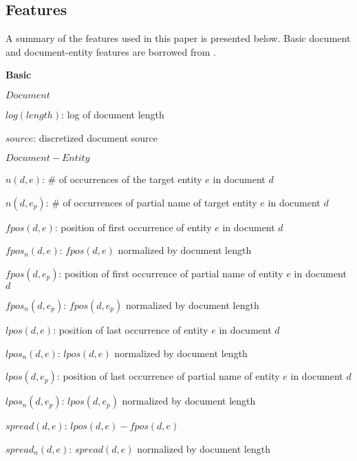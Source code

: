 \documentclass{article}
\begin{document}
\subsection{Features}
\label{feat}

A summary of the features used in this paper is presented below. Basic document and document-entity features are borrowed from \cite{jingang13}.

\begin{itemize*}
  \item \textbf{Basic}
    \begin{itemize*}
      \item $Document$
        \begin{itemize*}
            \item $log(length)$: log of document length
            \item $source$: discretized document source
        \end{itemize*}
      \item $Document-Entity$
        \begin{itemize*}
            \item $n(d,e)$: \# of occurrences of the target entity $e$ in document $d$
            \item $n(d,e_p)$: \# of occurrences of partial name of target entity $e$ in document $d$
            \item $fpos(d,e)$: position of first occurrence of entity $e$ in document $d$
            \item $fpos_n(d,e)$: $fpos(d,e)$ normalized by document length
            \item $fpos(d,e_p)$: position of first occurrence of partial name of entity $e$ in document $d$
            \item $fpos_n(d,e_p)$: $fpos(d,e_p)$ normalized by document length
            \item $lpos(d,e)$: position of last occurrence of entity $e$ in document $d$
            \item $lpos_n(d,e)$: $lpos(d,e)$ normalized by document length
            \item $lpos(d,e_p)$: position of last occurrence of partial name of entity $e$ in document $d$
            \item $lpos_n(d,e_p)$: $lpos(d,e_p)$ normalized by document length
            \item $spread(d,e)$: $lpos(d,e) - fpos(d,e)$
            \item $spread_n(d,e)$: $spread(d,e)$ normalized by document length

\end{itemize*}
\end{itemize*}
\end{itemize*}
\end{document}
